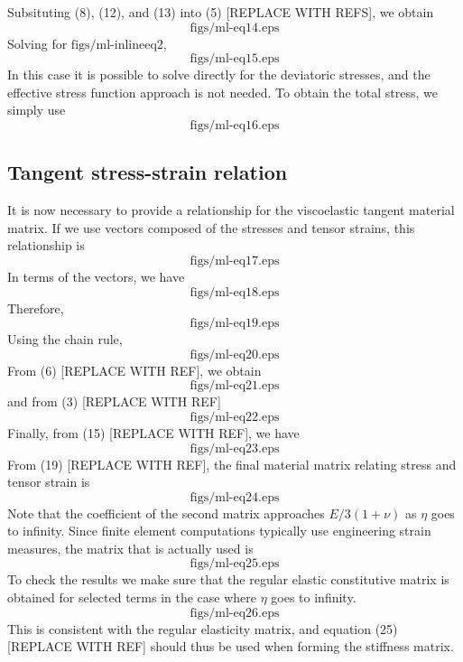 Subsituting (8), (12), and (13) into (5) [REPLACE WITH REFS], we obtain
\begin{equation}
  \text{figs/ml-eq14.eps}
\end{equation}
Solving for  $\text{figs/ml-inlineeq2}$,
\begin{equation}
  \text{figs/ml-eq15.eps}
\end{equation}
In this case it is possible to solve directly for the deviatoric
stresses, and the effective stress function approach is not needed. To
obtain the total stress, we simply use
\begin{equation}
  \text{figs/ml-eq16.eps}
\end{equation}

\subsection{Tangent stress-strain relation}

It is now necessary to provide a relationship for the viscoelastic
tangent material matrix. If we use vectors composed of the stresses
and tensor strains, this relationship is
\begin{equation}
  \text{figs/ml-eq17.eps}
\end{equation}
In terms of the vectors, we have
\begin{equation}
  \text{figs/ml-eq18.eps}
\end{equation}
Therefore,
\begin{equation}
  \text{figs/ml-eq19.eps}
\end{equation}
Using the chain rule,
\begin{equation}
  \text{figs/ml-eq20.eps}
\end{equation}
From (6) [REPLACE WITH REF], we obtain
\begin{equation}
  \text{figs/ml-eq21.eps}
\end{equation}
and from (3) [REPLACE WITH REF]
\begin{equation}
  \text{figs/ml-eq22.eps}
\end{equation}
Finally, from (15) [REPLACE WITH REF], we have
\begin{equation}
  \text{figs/ml-eq23.eps}
\end{equation}
From (19) [REPLACE WITH REF], the final material matrix relating
stress and tensor strain is
\begin{equation}
  \text{figs/ml-eq24.eps}
\end{equation}
Note that the coefficient of the second matrix approaches $E/3(1+\nu)$
as $\eta$ goes to infinity. Since finite element computations
typically use engineering strain measures, the matrix that is actually
used is
\begin{equation}
  \text{figs/ml-eq25.eps}
\end{equation}
To check the results we make sure that the regular elastic
constitutive matrix is obtained for selected terms in the case where
$\eta$ goes to infinity.
\begin{equation}
  \text{figs/ml-eq26.eps}
\end{equation}
This is consistent with the regular elasticity matrix, and equation
(25) [REPLACE WITH REF] should thus be used when forming the stiffness
matrix.


